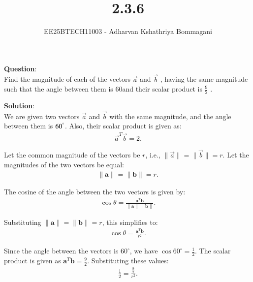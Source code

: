 \documentclass[journal]{IEEEtran}
\begin{document}

\vspace{3cm}

\title{2.3.6}
\author{EE25BTECH11003 - Adharvan Kshathriya Bommagani}
{\let\newpage\relax\maketitle}

\renewcommand{\thefigure}{\theenumi}
\renewcommand{\thetable}{\theenumi}
\setlength{\intextsep}{10pt} %
\textbf{Question}:\\
Find the magnitude of each of the vectors $\vec{a}$ and $\vec{b}$ , having the same magnitude
such that the angle between them is 60\degree and their scalar product is $\frac{9}{2}$ .
  
\bigskip

\textbf{Solution}:\\

We are given two vectors $\vec{a}$ and $\vec{b}$ with the same magnitude, and the angle between them is $60^\degree$. Also, their scalar product is given as:
\begin{align}
\vec{a}^T \vec{b} = 2.
\end{align}

\bigskip





Let the common magnitude of the vectors be $r$, i.e., $\|\vec{a}\| = \|\vec{b}\| = r$.
Let the magnitudes of the two vectors be equal:
\begin{align}
\|\mathbf{a}\| = \|\mathbf{b}\| = r.
\end{align}

The cosine of the angle between the two vectors is given by:
\begin{align}
\cos\theta = \frac{\mathbf{a}^T \mathbf{b}}{\|\mathbf{a}\|\,\|\mathbf{b}\|}.
\end{align}

Substituting $\|\mathbf{a}\| = \|\mathbf{b}\| = r$, this simplifies to:
\begin{align}
\cos\theta = \frac{\mathbf{a}^T \mathbf{b}}{r^2}.
\end{align}

Since the angle between the vectors is $60^\circ$, we have $\cos 60^\circ = \frac{1}{2}$.  
The scalar product is given as $\mathbf{a}^T \mathbf{b} = \frac{9}{2}$. Substituting these values:
\begin{align}
\frac{1}{2} = \frac{\frac{9}{2}}{r^2}.
\end{align}
\end{document}
